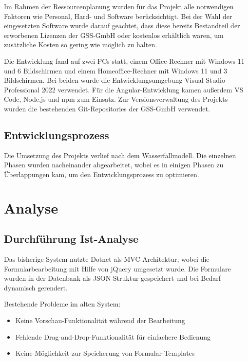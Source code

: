 \documentclass[a4paper,11pt]{article}
\begin{document}
Im Rahmen der Ressourcenplanung wurden für das Projekt alle notwendigen Faktoren wie Personal, Hard- und Software berücksichtigt. Bei der Wahl der eingesetzten Software wurde darauf geachtet, dass diese bereits Bestandteil der erworbenen Lizenzen der GSS-GmbH oder kostenlos erhältlich waren, um zusätzliche Kosten so gering wie möglich zu halten.

Die Entwicklung fand auf zwei PCs statt, einem Office-Rechner mit Windows 11 und 6 Bildschirmen und einem Homeoffice-Rechner mit Windows 11 und 3 Bildschirmen. Bei beiden wurde die Entwicklungsumgebung Visual Studio Professional 2022 verwendet. Für die Angular-Entwicklung kamen außerdem VS Code, Node.js und npm zum Einsatz. Zur Versionsverwaltung des Projekts wurden die bestehenden Git-Repositories der GSS-GmbH verwendet.

\subsection{Entwicklungsprozess}

Die Umsetzung des Projekts verlief nach dem Wasserfallmodell. Die einzelnen Phasen wurden nacheinander abgearbeitet, wobei es in einigen Phasen zu Überlappungen kam, um den Entwicklungsprozess zu optimieren.

\section{Analyse}

\subsection{Durchführung Ist-Analyse}

Das bisherige System nutzte Dotnet als MVC-Architektur, wobei die Formularbearbeitung mit Hilfe von jQuery umgesetzt wurde. Die Formulare wurden in der Datenbank als JSON-Struktur gespeichert und bei Bedarf dynamisch gerendert.

Bestehende Probleme im alten System:

\begin{itemize}
\item Keine Vorschau-Funktionalität während der Bearbeitung
\item Fehlende Drag-and-Drop-Funktionalität für einfachere Bedienung
\item Keine Möglichkeit zur Speicherung von Formular-Templates
\end{itemize}
\end{document}
